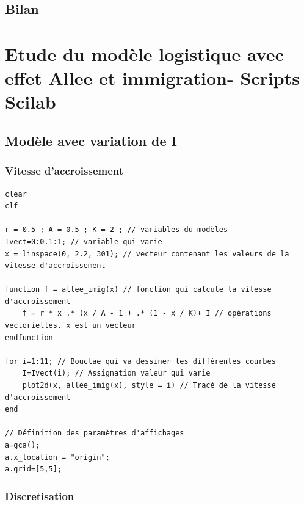 \documentclass{article}
\begin{document}
\subsection{Bilan}
\paragraph{}


\newpage
\appendix

\section{Etude du modèle logistique avec effet Allee et immigration- Scripts Scilab}

\subsection{Modèle avec variation de I}

\subsubsection{Vitesse d'accroissement}

\begin{verbatim}
clear
clf

r = 0.5 ; A = 0.5 ; K = 2 ; // variables du modèles
Ivect=0:0.1:1; // variable qui varie
x = linspace(0, 2.2, 301); // vecteur contenant les valeurs de la vitesse d'accroissement

function f = allee_imig(x) // fonction qui calcule la vitesse d'accroissement
    f = r * x .* (x / A - 1 ) .* (1 - x / K)+ I // opérations vectorielles. x est un vecteur
endfunction

for i=1:11; // Bouclae qui va dessiner les différentes courbes
    I=Ivect(i); // Assignation valeur qui varie
    plot2d(x, allee_imig(x), style = i) // Tracé de la vitesse d'accroissement
end

// Définition des paramètres d'affichages
a=gca();
a.x_location = "origin";
a.grid=[5,5];
\end{verbatim}

\subsubsection{Discretisation}
\end{document}
